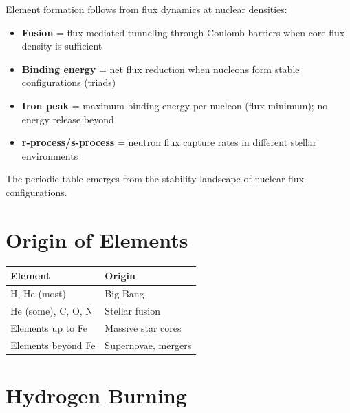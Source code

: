 \documentclass[
  11pt,
  letterpaper,
  twoside,
  openright]{book}
\providecommand{\tightlist}{%
  \setlength{\itemsep}{0pt}\setlength{\parskip}{0pt}}
\begin{document}
\begin{tcolorbox}[enhanced jigsaw, leftrule=.75mm, title=\textcolor{quarto-callout-note-color}{\faInfo}\hspace{0.5em}{How FTD Produces Nucleosynthesis}, bottomrule=.15mm, opacityback=0, coltitle=black, arc=.35mm, colframe=quarto-callout-note-color-frame, colbacktitle=quarto-callout-note-color!10!white, colback=white, titlerule=0mm, breakable, bottomtitle=1mm, toptitle=1mm, rightrule=.15mm, toprule=.15mm, left=2mm, opacitybacktitle=0.6]

Element formation follows from flux dynamics at nuclear densities:

\begin{itemize}
\tightlist
\item
  \textbf{Fusion} = flux-mediated tunneling through Coulomb barriers
  when core flux density is sufficient
\item
  \textbf{Binding energy} = net flux reduction when nucleons form stable
  configurations (triads)
\item
  \textbf{Iron peak} = maximum binding energy per nucleon (flux
  minimum); no energy release beyond
\item
  \textbf{r-process/s-process} = neutron flux capture rates in different
  stellar environments
\end{itemize}

The periodic table emerges from the stability landscape of nuclear flux
configurations.

\end{tcolorbox}

\section{Origin of Elements}\label{origin-of-elements}

\begin{longtable}[]{@{}ll@{}}
\toprule\noalign{}
Element & Origin \\
\midrule\noalign{}
\endhead
\bottomrule\noalign{}
\endlastfoot
H, He (most) & Big Bang \\
He (some), C, O, N & Stellar fusion \\
Elements up to Fe & Massive star cores \\
Elements beyond Fe & Supernovae, mergers \\
\end{longtable}

\section{Hydrogen Burning}\label{hydrogen-burning}
\end{document}
